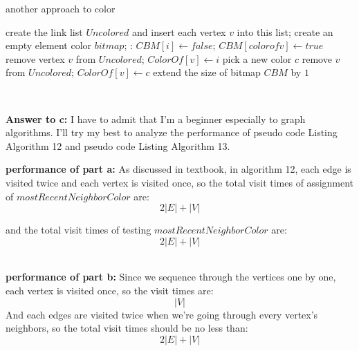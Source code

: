 \documentclass[a4paper,11pt]{article}
\theoremstyle{mytheor}
\begin{document}
\begin{algorithm}[H]
\caption{another approach to color}\label{Ex16b}
\begin{algorithmic}[1]
  \State create the link list $Uncolored$ and insert each vertex $v$ into this list;
  \State create an empty element color $bitmap$;
  :
                \State $CBM[i] \gets false$;
            \EndFor
                    \State $CBM[color of v] \gets true$
                \EndIf
            \EndFor
                    \State remove vertex $v$ from $Uncolored$;
                    \State $ColorOf[v] \gets i$
                \EndIf
            \EndFor
                \State pick a new color $c$
                \State remove $v$ from $Uncolored$;
                \State $ColorOf[v] \gets c$
                \State extend the size of bitmap $CBM$ by $1$
            \EndIf
        \EndFor
  \EndWhile
\EndProcedure
\end{algorithmic}
\end{algorithm}

~\\
\vspace{1.2in}

\noindent\textbf{Answer to c:} 
I have to admit that I'm a beginner especially to graph algorithms. I'll try my best to analyze the performance of pseudo code Listing Algorithm 12 and pseudo code Listing Algorithm 13.

\noindent\textbf{performance of part a:} As discussed in textbook, in algorithm 12, each edge is visited twice and each vertex is visited once, so the total visit times of assignment of $mostRecentNeighborColor$ are: $$2|E|+|V|$$

\noindent and the total visit times of testing $mostRecentNeighborColor$ are: $$2|E|+|V|$$

~\\
\noindent\textbf{performance of part b:}
Since we sequence through the vertices one by one, each vertex is visited once, so the visit times are: $$|V|$$
And each edges are visited twice when we're going through every vertex's neighbors, so the total visit times should be no less than:
$$2|E|+|V|$$
\end{document}
